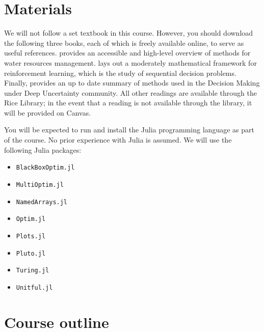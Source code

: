\documentclass[nobib]{tufte-handout}
\begin{document}
\section{Materials}

We will not follow a set textbook in this course.
However, you should download the following three books, each of which is freely available online, to serve as useful references.
\citet{loucks_planning:2017} provides an accessible and high-level overview of methods for water resources management.
\citet{sutton:2018} lays out a moderately mathematical framework for reinforcement learning, which is the study of sequential decision problems.
Finally, \citet{marchau:2019} provides an up to date summary of methods used in the Decision Making under Deep Uncertainty community.
All other readings are available through the Rice Library; in the event that a reading is  not available through the library, it will be provided on Canvas.

You will be expected to run and install the Julia programming language as part of the course.
No prior experience with Julia is assumed.
We will use the following Julia packages:
\begin{itemize}
	\item \texttt{BlackBoxOptim.jl}
	\item \texttt{MultiOptim.jl}
	\item \texttt{NamedArrays.jl}
	\item \texttt{Optim.jl}
	\item \texttt{Plots.jl}
	\item \texttt{Pluto.jl}
	\item \texttt{Turing.jl}
	\item \texttt{Unitful.jl}
\end{itemize}

\section{Course outline}
\end{document}
